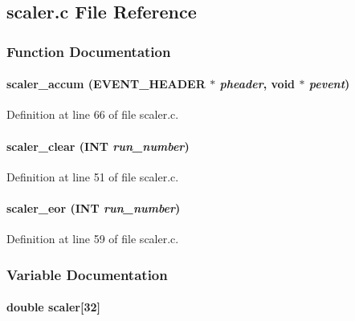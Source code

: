 \subsection{scaler.c File Reference}
\label{scaler_8c}


\subsubsection{Function Documentation}
\paragraph[{scaler\_\-accum}]{ scaler\_\-accum ({\bf EVENT\_\-HEADER} $\ast$ {\em pheader}, \/  void $\ast$ {\em pevent})}\hfill\label{scaler_8c_ab6c749a2690a47bc87827e76a5b3bc1f}


Definition at line 66 of file scaler.c.
\paragraph[{scaler\_\-clear}]{ scaler\_\-clear ({\bf INT} {\em run\_\-number})}\hfill\label{scaler_8c_a4f16616b45cc198ac351133d1e8d3fd1}


Definition at line 51 of file scaler.c.
\paragraph[{scaler\_\-eor}]{ scaler\_\-eor ({\bf INT} {\em run\_\-number})}\hfill\label{scaler_8c_ab74cee08d1231b7242c1da2409a1aa50}


Definition at line 59 of file scaler.c.

\subsubsection{Variable Documentation}
\paragraph[{scaler}]{\setlength{\rightskip}{0pt plus 5cm}double {\bf scaler}\mbox{[}32\mbox{]}}\hfill\label{scaler_8c_ab391a322195b8a0de3e2fd9d2950b82d}


